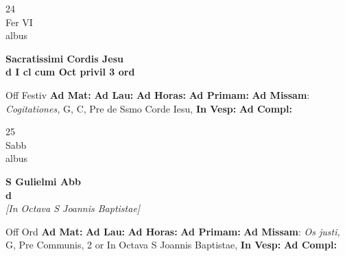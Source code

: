\documentclass[10pt, openany]{book}
\begin{document}
    \begin{center}
        \begin{minipage}{3.5in}
            \vspace{2em}
            \begin{minipage}{0.5in}
                {\Huge 24} \\
                {\normalsize Fer VI} \\
                {\normalsize albus}
            \end{minipage}
            \begin{minipage}{3.0in}
                \textbf{ \large Sacratissimi Cordis Jesu \\
                \textnormal{\normalsize d I cl cum Oct privil 3 ord}} \\ 
            \end{minipage}
            \begin{justify}Off Festiv
                \textbf{Ad Mat: }
                \textbf{Ad Lau: }
                \textbf{Ad Horas: }
                \textbf{Ad Primam: }\textbf{Ad Missam}: \textit{Cogitationes,} G, C, Pre de Ssmo Corde Iesu,  
                \textbf{In Vesp: }
                \textbf{Ad Compl: }
            \end{justify}
        \end{minipage}
    \end{center}

    \begin{center}
        \begin{minipage}{3.5in}
            \vspace{2em}
            \begin{minipage}{0.5in}
                {\Huge 25} \\
                {\normalsize Sabb} \\
                {\normalsize albus}
            \end{minipage}
            \begin{minipage}{3.0in}
                \textbf{ \large S Gulielmi Abb \\
                \textnormal{\normalsize d}} \\ \textit{[In Octava S Joannis Baptistae]} \\ 
            \end{minipage}
            \begin{justify}Off Ord
                \textbf{Ad Mat: }
                \textbf{Ad Lau: }
                \textbf{Ad Horas: }
                \textbf{Ad Primam: }\textbf{Ad Missam}: \textit{Os justi,} G, Pre Communis, 2 or In Octava S Joannis Baptistae,  
                \textbf{In Vesp: }
                \textbf{Ad Compl: }
            \end{justify}
        \end{minipage}
    \end{center}
\end{document}
